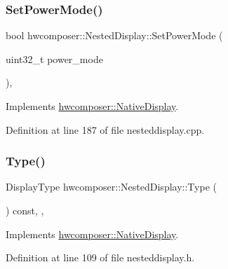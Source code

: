 \subsubsection{\texorpdfstring{Set\+Power\+Mode()}{SetPowerMode()}}
{\footnotesize\ttfamily bool hwcomposer\+::\+Nested\+Display\+::\+Set\+Power\+Mode (\begin{DoxyParamCaption}\item[{uint32\+\_\+t}]{power\+\_\+mode }\end{DoxyParamCaption})\hspace{0.3cm}{\ttfamily [override]}, {\ttfamily [virtual]}}



Implements \mbox{\hyperlink{classhwcomposer_1_1NativeDisplay_a9ea847cb1e75677fca7dabbcfb59a26a}{hwcomposer\+::\+Native\+Display}}.



Definition at line 187 of file nesteddisplay.\+cpp.


\begin{DoxyCode}{0}
\end{DoxyCode}
\mbox{\label{classhwcomposer_1_1NestedDisplay_a5e0cd87bc15e94b2997fcfbb37060602}} 
\subsubsection{\texorpdfstring{Type()}{Type()}}
{\footnotesize\ttfamily Display\+Type hwcomposer\+::\+Nested\+Display\+::\+Type (\begin{DoxyParamCaption}{ }\end{DoxyParamCaption}) const\hspace{0.3cm}{\ttfamily [inline]}, {\ttfamily [override]}, {\ttfamily [virtual]}}



Implements \mbox{\hyperlink{classhwcomposer_1_1NativeDisplay_a67018275066174f9e5d4b801cd6fea31}{hwcomposer\+::\+Native\+Display}}.



Definition at line 109 of file nesteddisplay.\+h.


\begin{DoxyCode}{0}
\end{DoxyCode}
\mbox{\label{classhwcomposer_1_1NestedDisplay_a0eb08cdb0c39587a72021ff945d33b72}} 
